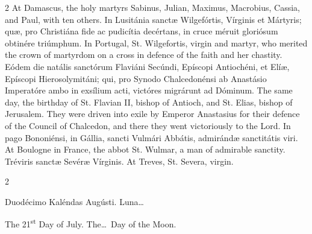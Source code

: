 \begin{paracol}{2}
\switchcolumn
{}
At Damascus, the holy martyrs 
 Sabinus, Julian, Maximus, Macrobius, Cassia, and Paul, with ten others.
\switchcolumn*
{}
In Lusitánia sanctæ 
 Wilgefórtis, Vírginis et Mártyris; quæ, pro Christiána fide ac pudicítia 
 decértans, in cruce méruit gloriósum obtinére triúmphum.
\switchcolumn
{}
In Portugal, St. Wilgefortis, virgin 
 and martyr, who merited the crown of martyrdom on a cross in defence of the 
 faith and her chastity.
\switchcolumn*
{}
Eódem die natális 
 sanctórum Flaviáni Secúndi, Epíscopi Antiochéni, et Elíæ, Epíscopi 
 Hierosolymitáni; qui, pro Synodo Chalcedonénsi ab Anastásio Imperatóre ambo 
 in exsílium acti, victóres migrárunt ad Dóminum.
\switchcolumn
{}
The same day, the birthday of St. 
 Flavian II, bishop of Antioch, and St. Elias, bishop of Jerusalem. 
 They were driven into exile by Emperor Anastasius for their defence of the 
 Council of Chalcedon, and there they went victoriously to the Lord.
\switchcolumn*
{}
In pago Bononiénsi, in 
 Gállia, sancti Vulmári Abbátis, admirándæ sanctitátis viri.
\switchcolumn
{}
At Boulogne in France, the abbot St. 
 Wulmar, a man of admirable sanctity.
\switchcolumn*
{}
Tréviris sanctæ Sevéræ 
 Vírginis.
\switchcolumn
{}
At Treves, St. Severa, virgin.
\switchcolumn*
{}
\end{paracol}


\begin{paracol}{2}
\begin{center}{\color{gregoriocolor} Duodécimo Kaléndas Augústi. 
 Luna\dots\ }\end{center}
\switchcolumn
{}
\begin{center}{\color{gregoriocolor} The 
 21\textsuperscript{st} Day of 
 July. The\dots\ Day of the Moon.}\end{center}
\end{paracol}

